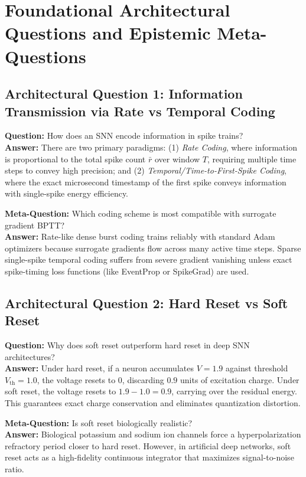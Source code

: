 \documentclass[11pt,a4paper]{article}
\theoremstyle{definition}
\begin{document}
\section{Foundational Architectural Questions and Epistemic Meta-Questions}

\subsection{Architectural Question 1: Information Transmission via Rate vs Temporal Coding}
\textbf{Question:} How does an SNN encode information in spike trains?\\
\textbf{Answer:} There are two primary paradigms: (1) \emph{Rate Coding}, where information is proportional to the total spike count $\bar{r}$ over window $T$, requiring multiple time steps to convey high precision; and (2) \emph{Temporal/Time-to-First-Spike Coding}, where the exact microsecond timestamp of the first spike conveys information with single-spike energy efficiency.

\textbf{Meta-Question:} Which coding scheme is most compatible with surrogate gradient BPTT?\\
\textbf{Answer:} Rate-like dense burst coding trains reliably with standard Adam optimizers because surrogate gradients flow across many active time steps. Sparse single-spike temporal coding suffers from severe gradient vanishing unless exact spike-timing loss functions (like EventProp or SpikeGrad) are used.

\subsection{Architectural Question 2: Hard Reset vs Soft Reset}
\textbf{Question:} Why does soft reset outperform hard reset in deep SNN architectures?\\
\textbf{Answer:} Under hard reset, if a neuron accumulates $V = 1.9$ against threshold $V_{\text{th}} = 1.0$, the voltage resets to $0$, discarding $0.9$ units of excitation charge. Under soft reset, the voltage resets to $1.9 - 1.0 = 0.9$, carrying over the residual energy. This guarantees exact charge conservation and eliminates quantization distortion.

\textbf{Meta-Question:} Is soft reset biologically realistic?\\
\textbf{Answer:} Biological potassium and sodium ion channels force a hyperpolarization refractory period closer to hard reset. However, in artificial deep networks, soft reset acts as a high-fidelity continuous integrator that maximizes signal-to-noise ratio.
\end{document}
